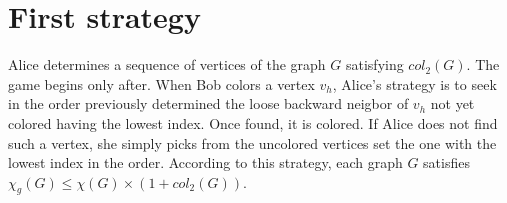 \section{First strategy}

Alice determines a sequence of vertices of the graph $G$ satisfying $col_{2}(G)$. The game begins only after.
When Bob colors a vertex $v_{h}$,
Alice's strategy is to seek in the order previously determined the loose backward neigbor of $v_{h}$ not yet
colored having the lowest index. Once found, it is colored. If Alice does not find such a vertex, she simply picks from the uncolored vertices set the one with the lowest index in the order.
According to this strategy, each graph $G$ satisfies $\chi_{g}(G) \leq \chi(G) \times (1 + col_{2}(G))$.